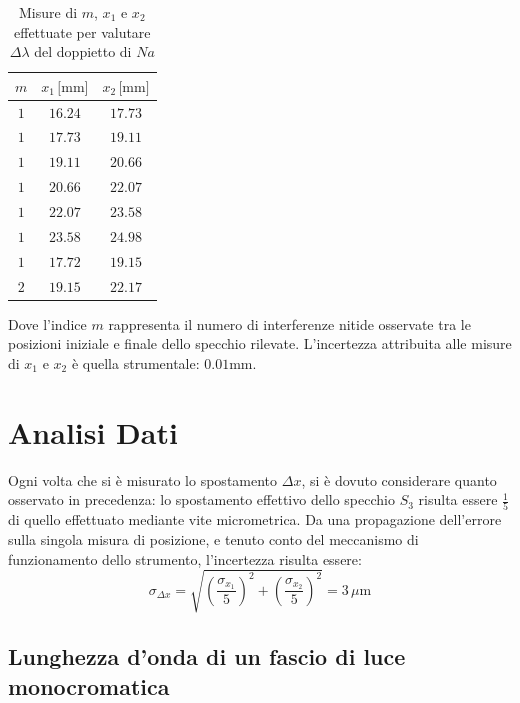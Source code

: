 \documentclass[]{article}
\let\oldsection\section%
\renewcommand{\section}{%
	\renewcommand{\theequation}{\thesection.\arabic{equation}}%
	\oldsection}%
\let\oldsubsection\subsection%
\renewcommand{\subsection}{%
	\renewcommand{\theequation}{\thesubsection.\arabic{equation}}%
	\oldsubsection}%
\begin{document}
\begin{table}[H]
    \centering

    \begin{tabular}{||c|c|c||}
        \hline
        $m $ & $x_1 \, \text{[mm]}$ & $x_2\, \text{[mm]}$ \\
        \hline\hline

        $1$ & $16.24$ & $17.73$ \\\hline
        $1$ & $17.73$ & $19.11$ \\\hline
        $1$ & $19.11$ & $20.66$ \\\hline
        $1$ & $20.66$ & $22.07$ \\\hline
        $1$ & $22.07$ & $23.58$ \\\hline
        $1$ & $23.58$ & $24.98$ \\\hline
        $1$ & $17.72$ & $19.15$ \\\hline
        $2$ & $19.15$ & $22.17$ \\\hline
    
    \end{tabular}
    \caption{Misure di $m$, $x_1$ e $x_2$ effettuate per valutare $\Delta \lambda$ del doppietto di $Na$ }
    \label{sodio}    
\end{table}
Dove l'indice $m$ rappresenta il numero di interferenze nitide osservate tra le posizioni iniziale e finale dello specchio rilevate. L'incertezza attribuita alle misure di $x_1$ e $x_2$ è quella strumentale: $0.01 \text{mm}$.


\section{Analisi Dati}

Ogni volta che si è misurato lo spostamento $\Delta x$, si è dovuto considerare quanto osservato in precedenza: lo spostamento effettivo dello specchio $S_3$ risulta essere $\frac{1}{5}$ di quello effettuato mediante vite micrometrica. Da una propagazione dell'errore sulla singola misura di posizione, e tenuto conto del meccanismo di funzionamento dello strumento, l'incertezza risulta essere:
\begin{equation}
    \label{err-delta-x}
    \sigma_{\Delta x} = \sqrt{ \left(\frac{\sigma_{x_1}}{5}\right)^2 + \left(\frac{\sigma_{x_2}}{5}\right)^2} = 3 \, \mu \text{m}
\end{equation}

\subsection{Lunghezza d'onda di un fascio di luce monocromatica}
\end{document}
